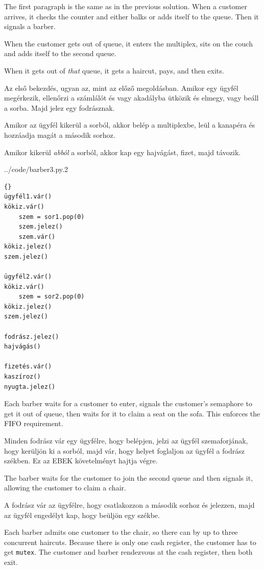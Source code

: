 \documentclass{book}
\begin{document}
The first paragraph is the same as in the previous solution.  When
a customer arrives, it checks the counter and either balks or adds
itself to the queue.  Then it signals a barber.

When the customer gets out of queue, it enters the multiplex,
sits on the couch and adds itself to the second queue.

When it gets out of {\em that} queue, it gets a haircut, pays,
and then exits.

Az első bekezdés, ugyan az, mint az előző megoldásban. Amikor egy ügyfél
megérkezik, ellenőrzi a számlálót és vagy akadályba ütközik és elmegy, vagy beáll
a sorba. Majd jelez egy fodrásznak.

Amikor az ügyfél kikerül a sorból, akkor belép a multiplexbe,
leül a kanapéra és hozzáadja magát a második sorhoz.

Amikor kikerül {\em abból} a sorból, akkor kap egy hajvágást, fizet, majd távozik.
    

{../code/barber3.py.2}

\begin{lstlisting}[title={Hilzer fodrászata megoldás (fodrász)}]{}
ügyfél1.vár()
kökiz.vár()
    szem = sor1.pop(0)
    szem.jelez()
    szem.vár()
kökiz.jelez()
szem.jelez()

ügyfél2.vár()
kökiz.vár()
    szem = sor2.pop(0)
kökiz.jelez()
szem.jelez()

fodrász.jelez()
hajvágás()

fizetés.vár()
kaszíroz()
nyugta.jelez()

\end{lstlisting}

Each barber waits for a customer to enter, signals the customer's
semaphore to get it out of queue, then waits for it to claim a seat
on the sofa.  This enforces the FIFO requirement.

Minden fodrász vár egy ügyfélre, hogy belépjen, jelzi az ügyfél szemaforjának,
hogy kerüljön ki a sorból, majd vár, hogy helyet foglaljon az ügyfél a
fodrász székben. Ez az EBEK követelményt hajtja végre.

The barber waits for the customer to join the second queue and then
signals it, allowing the customer to claim a chair.

A fodrász vár az ügyfélre, hogy csatlakozzon a második sorhoz és jelezzen,
majd az ügyfél engedélyt kap, hogy beüljön egy székbe.

Each barber admits one customer to the chair, so there can by up
to three concurrent haircuts.  Because there is only one cash
register, the customer has to get {\tt mutex}.  The customer
and barber rendezvous at the cash register, then both exit.
\end{document}
